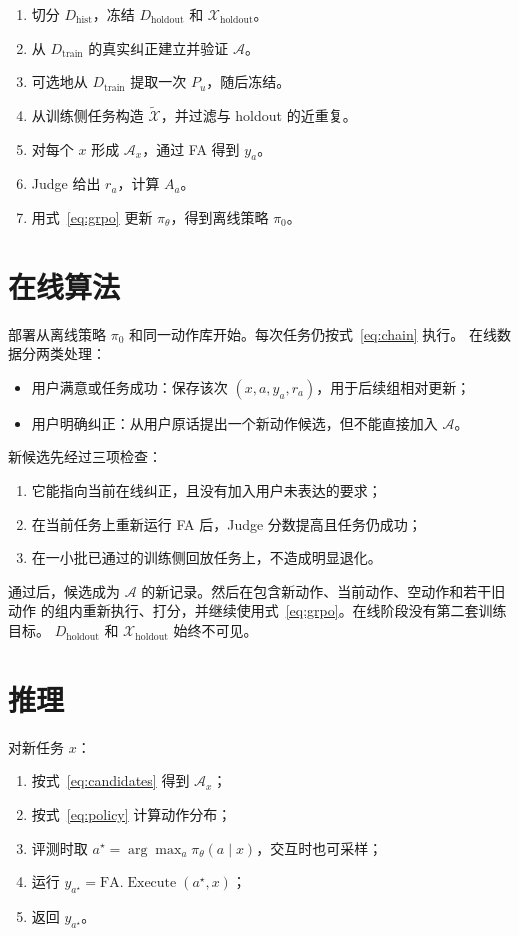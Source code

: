 \documentclass[11pt,UTF8,fontset=fandol]{ctexart}
\newcommand{\Dhist}{D_{\mathrm{hist}}}
\newcommand{\Dtrain}{D_{\mathrm{train}}}
\newcommand{\Dholdout}{D_{\mathrm{holdout}}}
\newcommand{\Xholdout}{\mathcal X_{\mathrm{holdout}}}
\newcommand{\Xsim}{\widetilde{\mathcal X}}
\newcommand{\policy}{\pi_{\theta}}
\newcommand{\FA}{\mathrm{FA}}
\begin{document}
\begin{enumerate}
  \item 切分 \(\Dhist\)，冻结 \(\Dholdout\) 和 \(\Xholdout\)。
  \item 从 \(\Dtrain\) 的真实纠正建立并验证 \(\mathcal A\)。
  \item 可选地从 \(\Dtrain\) 提取一次 \(P_u\)，随后冻结。
  \item 从训练侧任务构造 \(\Xsim\)，并过滤与 holdout 的近重复。
  \item 对每个 \(x\) 形成 \(\mathcal A_x\)，通过 FA 得到 \(y_a\)。
  \item Judge 给出 \(r_a\)，计算 \(A_a\)。
  \item 用式~\eqref{eq:grpo} 更新 \(\policy\)，得到离线策略 \(\pi_0\)。
\end{enumerate}

\section{在线算法}

部署从离线策略 \(\pi_0\) 和同一动作库开始。每次任务仍按式~\eqref{eq:chain} 执行。
在线数据分两类处理：
\begin{itemize}
  \item 用户满意或任务成功：保存该次 \((x,a,y_a,r_a)\)，用于后续组相对更新；
  \item 用户明确纠正：从用户原话提出一个新动作候选，但不能直接加入 \(\mathcal A\)。
\end{itemize}

新候选先经过三项检查：
\begin{enumerate}
  \item 它能指向当前在线纠正，且没有加入用户未表达的要求；
  \item 在当前任务上重新运行 FA 后，Judge 分数提高且任务仍成功；
  \item 在一小批已通过的训练侧回放任务上，不造成明显退化。
\end{enumerate}
通过后，候选成为 \(\mathcal A\) 的新记录。然后在包含新动作、当前动作、空动作和若干旧动作
的组内重新执行、打分，并继续使用式~\eqref{eq:grpo}。在线阶段没有第二套训练目标。
\(\Dholdout\) 和 \(\Xholdout\) 始终不可见。

\section{推理}

对新任务 \(x\)：
\begin{enumerate}
  \item 按式~\eqref{eq:candidates} 得到 \(\mathcal A_x\)；
  \item 按式~\eqref{eq:policy} 计算动作分布；
  \item 评测时取 \(a^\star=\arg\max_a\policy(a\mid x)\)，交互时也可采样；
  \item 运行 \(y_{a^\star}=\FA.\operatorname{Execute}(a^\star,x)\)；
  \item 返回 \(y_{a^\star}\)。
\end{enumerate}
\end{document}
